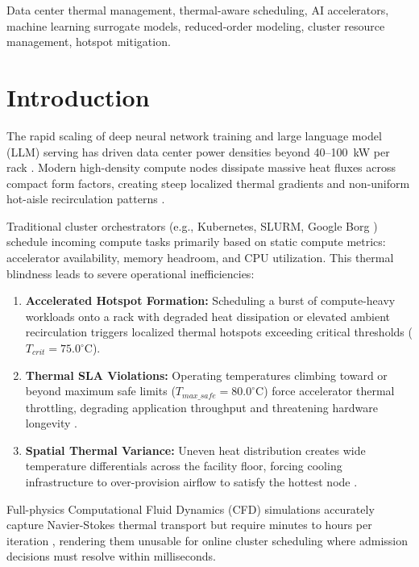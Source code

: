 \documentclass[conference,10pt]{IEEEtran}
\begin{document}
\begin{IEEEkeywords}
Data center thermal management, thermal-aware scheduling, AI accelerators, machine learning surrogate models, reduced-order modeling, cluster resource management, hotspot mitigation.
\end{IEEEkeywords}

\section{Introduction}
The rapid scaling of deep neural network training and large language model (LLM) serving has driven data center power densities beyond 40--100~kW per rack \cite{patterson2021carbon, jouppi2023tpu, vaswani2017attention, barroso2018datacenter}. Modern high-density compute nodes dissipate massive heat fluxes across compact form factors, creating steep localized thermal gradients and non-uniform hot-aisle recirculation patterns \cite{moore2005temperature, tang2008thermal, sharma2002balance}.

Traditional cluster orchestrators (e.g., Kubernetes, SLURM, Google Borg \cite{verma2015large}) schedule incoming compute tasks primarily based on static compute metrics: accelerator availability, memory headroom, and CPU utilization. This thermal blindness leads to severe operational inefficiencies:
\begin{enumerate}
    \item \textbf{Accelerated Hotspot Formation:} Scheduling a burst of compute-heavy workloads onto a rack with degraded heat dissipation or elevated ambient recirculation triggers localized thermal hotspots exceeding critical thresholds ($T_{crit} = 75.0^\circ\text{C}$).
    \item \textbf{Thermal SLA Violations:} Operating temperatures climbing toward or beyond maximum safe limits ($T_{max\_safe} = 80.0^\circ\text{C}$) force accelerator thermal throttling, degrading application throughput and threatening hardware longevity \cite{ashrae2021thermal}.
    \item \textbf{Spatial Thermal Variance:} Uneven heat distribution creates wide temperature differentials across the facility floor, forcing cooling infrastructure to over-provision airflow to satisfy the hottest node \cite{sharma2002balance, ahmad2015thermal}.
\end{enumerate}

Full-physics Computational Fluid Dynamics (CFD) simulations accurately capture Navier-Stokes thermal transport but require minutes to hours per iteration \cite{choi2008cfd}, rendering them unusable for online cluster scheduling where admission decisions must resolve within milliseconds.
\end{document}
